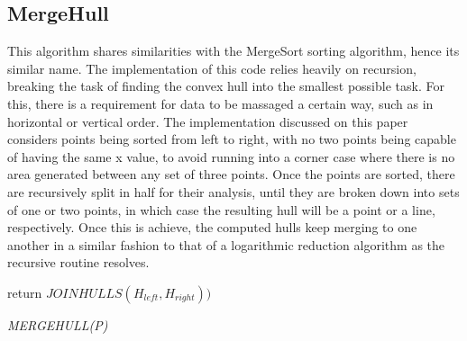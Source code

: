 \documentclass{article}
\begin{document}
\subsection{MergeHull}

This algorithm shares similarities with the MergeSort sorting algorithm, hence its similar name. The implementation of this code relies heavily on recursion, breaking the task of finding the convex hull into the smallest possible task. For this, there is a requirement for data to be massaged a certain way, such as in horizontal or vertical order. The implementation discussed on this paper considers points being sorted from left to right, with no two points being capable of having the same x value, to avoid running into a corner case where there is no area generated between any set of three points. Once the points are sorted, there are recursively split in half for their analysis, until they are broken down into sets of one or two points, in which case the resulting hull will be a point or a line, respectively. Once this is achieve, the computed hulls keep merging to one another in a similar fashion to that of a logarithmic reduction algorithm as the recursive routine resolves.

\begin{algorithm}[H]
\SetAlgoLined
{}
return $JOINHULLS(H_{left},H_{right}))$\;
\caption{\textit{MERGEHULL(P)}}
\end{algorithm}
\end{document}

